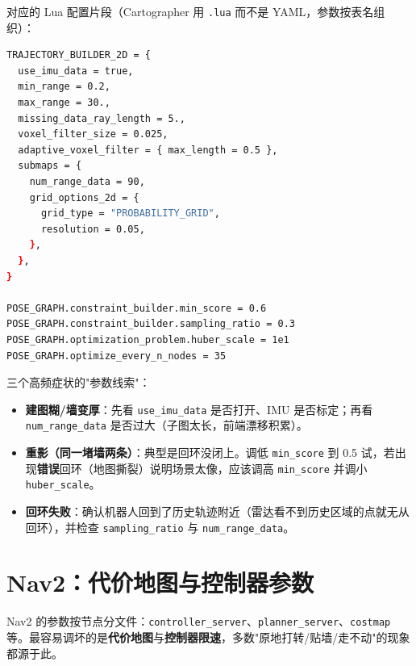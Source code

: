 对应的 Lua 配置片段（Cartographer 用 \lstinline{.lua} 而不是 YAML，参数按表名组织）：

\begin{lstlisting}[language=bash,caption={Cartographer 2D 关键配置（Lua）},label={lst:27-carto}]
TRAJECTORY_BUILDER_2D = {
  use_imu_data = true,
  min_range = 0.2,
  max_range = 30.,
  missing_data_ray_length = 5.,
  voxel_filter_size = 0.025,
  adaptive_voxel_filter = { max_length = 0.5 },
  submaps = {
    num_range_data = 90,
    grid_options_2d = {
      grid_type = "PROBABILITY_GRID",
      resolution = 0.05,
    },
  },
}

POSE_GRAPH.constraint_builder.min_score = 0.6
POSE_GRAPH.constraint_builder.sampling_ratio = 0.3
POSE_GRAPH.optimization_problem.huber_scale = 1e1
POSE_GRAPH.optimize_every_n_nodes = 35
\end{lstlisting}

三个高频症状的"参数线索"：

\begin{itemize}
  \item \textbf{建图糊/墙变厚}：先看 \lstinline{use_imu_data} 是否打开、IMU 是否标定；再看 \lstinline{num_range_data} 是否过大（子图太长，前端漂移积累）。
  \item \textbf{重影（同一堵墙两条）}：典型是回环没闭上。调低 \lstinline{min_score} 到 0.5 试，若出现\textbf{错误}回环（地图撕裂）说明场景太像，应该调高 \lstinline{min_score} 并调小 \lstinline{huber_scale}。
  \item \textbf{回环失败}：确认机器人回到了历史轨迹附近（雷达看不到历史区域的点就无从回环），并检查 \lstinline{sampling_ratio} 与 \lstinline{num_range_data}。
\end{itemize}

\section{Nav2：代价地图与控制器参数}\label{sec:27-nav2}

Nav2 的参数按节点分文件：\lstinline{controller_server}、\lstinline{planner_server}、\lstinline{costmap} 等\cite{macenski2020nav2}。最容易调坏的是\textbf{代价地图}与\textbf{控制器限速}，多数"原地打转/贴墙/走不动"的现象都源于此。

